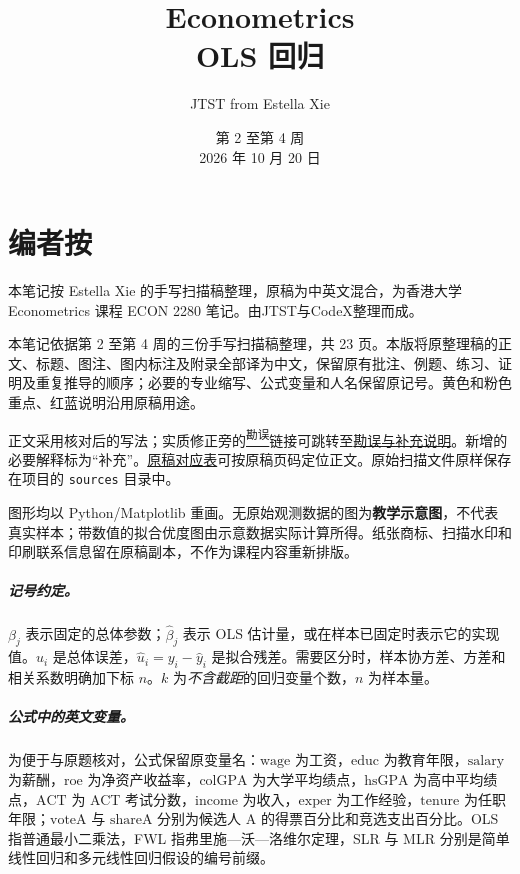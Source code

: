 \documentclass[12pt,a4paper,oneside]{report}
\title{\textbf{Econometrics}\\[0.5em]\large OLS 回归}
\author{JTST from Estella Xie}
\date{第 2 至第 4 周\\2026 年 10 月 20 日}
\theoremstyle{definition}
\newcommand{\corr}[1]{\unskip\nobreak\hspace{.08em}\hyperref[err:#1]{\textsuperscript{\color{noteRed}\scriptsize 勘误}}}
\newcommand{\educ}{\mathrm{educ}}
\newcommand{\wage}{\mathrm{wage}}
\newcommand{\hsGPA}{\mathrm{hsGPA}}
\newcommand{\colGPA}{\mathrm{colGPA}}
\newcommand{\ACT}{\mathrm{ACT}}
\begin{document}
\maketitle
{}
\tableofcontents
\clearpage
\chapter*{编者按}

本笔记按 Estella Xie 的手写扫描稿整理，原稿为中英文混合，为香港大学 Econometrics 课程 ECON 2280 笔记。由JTST与CodeX整理而成。

本笔记依据第 2 至第 4 周的三份手写扫描稿整理，共 23 页。本版将原整理稿的正文、标题、图注、图内标注及附录全部译为中文，保留原有批注、例题、练习、证明及重复推导的顺序；必要的专业缩写、公式变量和人名保留原记号。黄色和粉色重点、红蓝说明沿用原稿用途。

正文采用核对后的写法；实质修正旁的\corr{notation}链接可跳转至\hyperref[app:errata]{勘误与补充说明}。新增的必要解释标为“补充”。\hyperref[app:sources]{原稿对应表}可按原稿页码定位正文。原始扫描文件原样保存在项目的 \texttt{sources} 目录中。

图形均以 Python/Matplotlib 重画。无原始观测数据的图为\textbf{教学示意图}，不代表真实样本；带数值的拟合优度图由示意数据实际计算所得。纸张商标、扫描水印和印刷联系信息留在原稿副本，不作为课程内容重新排版。

\paragraph{记号约定。}$\beta_j$ 表示固定的总体参数；$\hat\beta_j$ 表示 OLS 估计量，或在样本已固定时表示它的实现值。$u_i$ 是总体误差，$\hat u_i=y_i-\hat y_i$ 是拟合残差。需要区分时，样本协方差、方差和相关系数明确加下标 $n$。$k$ 为\emph{不含截距}的回归变量个数，$n$ 为样本量。

\paragraph{公式中的英文变量。}为便于与原题核对，公式保留原变量名：$\wage$ 为工资，$\educ$ 为教育年限，$\mathrm{salary}$ 为薪酬，$\mathrm{roe}$ 为净资产收益率，$\colGPA$ 为大学平均绩点，$\hsGPA$ 为高中平均绩点，$\ACT$ 为 ACT 考试分数，$\mathrm{income}$ 为收入，$\mathrm{exper}$ 为工作经验，$\mathrm{tenure}$ 为任职年限；$\mathrm{voteA}$ 与 $\mathrm{shareA}$ 分别为候选人 A 的得票百分比和竞选支出百分比。OLS 指普通最小二乘法，FWL 指弗里施—沃—洛维尔定理，SLR 与 MLR 分别是简单线性回归和多元线性回归假设的编号前缀。

\clearpage
{}
\setcounter{chapter}{1}



\appendix
{}


\end{document}
